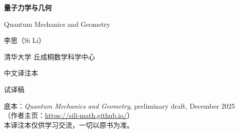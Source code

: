 \begin{titlepage}
\centering
\vspace*{2.2cm}

{\Huge\bfseries 量子力学与几何\par}
\vspace{0.7cm}
{\large Quantum Mechanics and Geometry\par}

\vspace{1.6cm}
{\Large 李思（Si Li）\par}
\vspace{0.25cm}
{\normalsize 清华大学 丘成桐数学科学中心\par}

\vspace{2.4cm}
{\Large 中文译注本\par}
\vspace{0.35cm}
{\normalsize 试译稿\par}

\vfill
\begin{center}
\small
底本：\textit{Quantum Mechanics and Geometry}, preliminary draft, December 2025\\
（作者主页：\url{https://sili-math.github.io/}）\\
本译注本仅供学习交流，一切以原书为准。
\end{center}
\vspace{0.8cm}
\end{titlepage}
